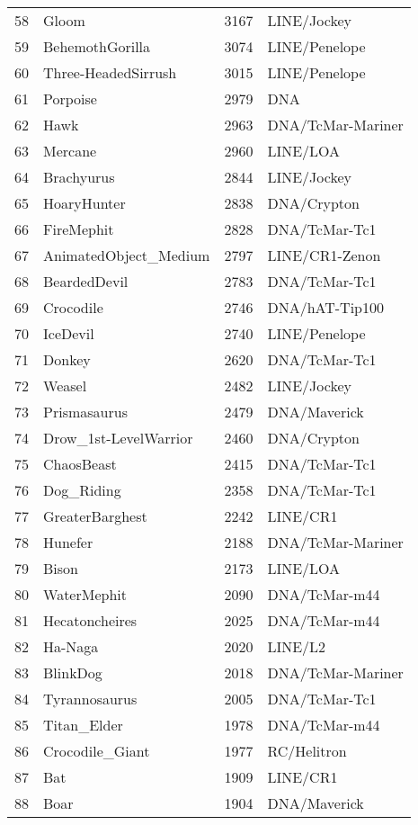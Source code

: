 \begin{table}[ht]
\begin{tabular}{rlrl}
  58 & Gloom & 3167 & LINE/Jockey  \\ 
  59 & BehemothGorilla & 3074 & LINE/Penelope  \\ 
  60 & Three-HeadedSirrush & 3015 & LINE/Penelope  \\ 
  61 & Porpoise & 2979 & DNA  \\ 
  62 & Hawk & 2963 & DNA/TcMar-Mariner  \\ 
  63 & Mercane & 2960 & LINE/LOA  \\ 
  64 & Brachyurus & 2844 & LINE/Jockey  \\ 
  65 & HoaryHunter & 2838 & DNA/Crypton  \\ 
  66 & FireMephit & 2828 & DNA/TcMar-Tc1  \\ 
  67 & AnimatedObject\_Medium & 2797 & LINE/CR1-Zenon  \\ 
  68 & BeardedDevil & 2783 & DNA/TcMar-Tc1  \\ 
  69 & Crocodile & 2746 & DNA/hAT-Tip100  \\ 
  70 & IceDevil & 2740 & LINE/Penelope  \\ 
  71 & Donkey & 2620 & DNA/TcMar-Tc1  \\ 
  72 & Weasel & 2482 & LINE/Jockey  \\ 
  73 & Prismasaurus & 2479 & DNA/Maverick  \\ 
  74 & Drow\_1st-LevelWarrior & 2460 & DNA/Crypton  \\ 
  75 & ChaosBeast & 2415 & DNA/TcMar-Tc1  \\ 
  76 & Dog\_Riding & 2358 & DNA/TcMar-Tc1  \\ 
  77 & GreaterBarghest & 2242 & LINE/CR1  \\ 
  78 & Hunefer & 2188 & DNA/TcMar-Mariner  \\ 
  79 & Bison & 2173 & LINE/LOA  \\ 
  80 & WaterMephit & 2090 & DNA/TcMar-m44  \\ 
  81 & Hecatoncheires & 2025 & DNA/TcMar-m44  \\ 
  82 & Ha-Naga & 2020 & LINE/L2  \\ 
  83 & BlinkDog & 2018 & DNA/TcMar-Mariner  \\ 
  84 & Tyrannosaurus & 2005 & DNA/TcMar-Tc1  \\ 
  85 & Titan\_Elder & 1978 & DNA/TcMar-m44  \\ 
  86 & Crocodile\_Giant & 1977 & RC/Helitron  \\ 
  87 & Bat & 1909 & LINE/CR1  \\ 
  88 & Boar & 1904 & DNA/Maverick  \\ 

\end{tabular}
\end{table}
